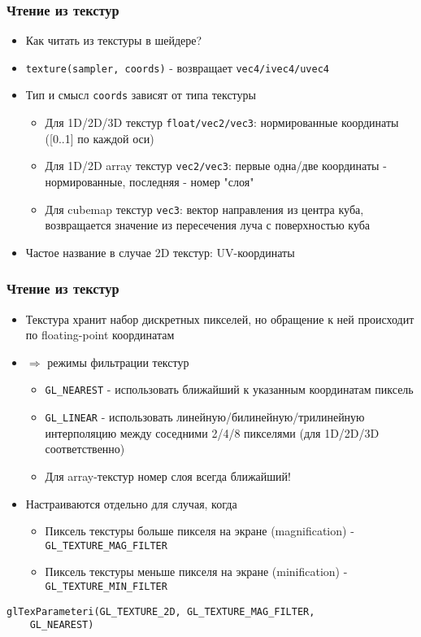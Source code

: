 \documentclass{beamer}
\begin{document}
\begin{frame}[fragile]
\frametitle{Чтение из текстур}
\begin{itemize}
\item Как читать из текстуры в шейдере?
\pause
\item \verb|texture(sampler, coords)| - возвращает \verb|vec4/ivec4/uvec4|
\pause
\item Тип и смысл \verb|coords| зависят от типа текстуры
\pause
\begin{itemize}
\item Для 1D/2D/3D текстур \verb|float/vec2/vec3|: нормированные координаты ([0..1] по каждой оси)
\pause
\item Для 1D/2D array текстур \verb|vec2/vec3|: первые одна/две координаты - нормированные, последняя - номер "слоя"
\pause
\item Для cubemap текстур \verb|vec3|: вектор направления из центра куба, возвращается значение из пересечения луча с поверхностью куба
\end{itemize}
\pause
\item Частое название в случае 2D текстур: UV-координаты
\end{itemize}
\end{frame}

\begin{frame}[fragile]
\frametitle{Чтение из текстур}
\begin{itemize}
\item Текстура хранит набор дискретных пикселей, но обращение к ней происходит по floating-point координатам
\pause
\item \begin{math}\Rightarrow\end{math} режимы фильтрации текстур
\begin{itemize}
\item \verb|GL_NEAREST| - использовать ближайший к указанным координатам пиксель
\item \verb|GL_LINEAR| - использовать линейную/билинейную/трилинейную интерполяцию между соседними 2/4/8 пикселями (для 1D/2D/3D соответственно)
\item Для array-текстур номер слоя всегда ближайший!
\end{itemize}
\pause
\item Настраиваются отдельно для случая, когда
\begin{itemize}
\item Пиксель текстуры больше пикселя на экране (magnification) - \verb|GL_TEXTURE_MAG_FILTER|
\item Пиксель текстуры меньше пикселя на экране (minification) - \verb|GL_TEXTURE_MIN_FILTER|
\end{itemize}
\end{itemize}
\pause
\begin{verbatim}
glTexParameteri(GL_TEXTURE_2D, GL_TEXTURE_MAG_FILTER,
    GL_NEAREST)
\end{verbatim}
\end{frame}
\end{document}
